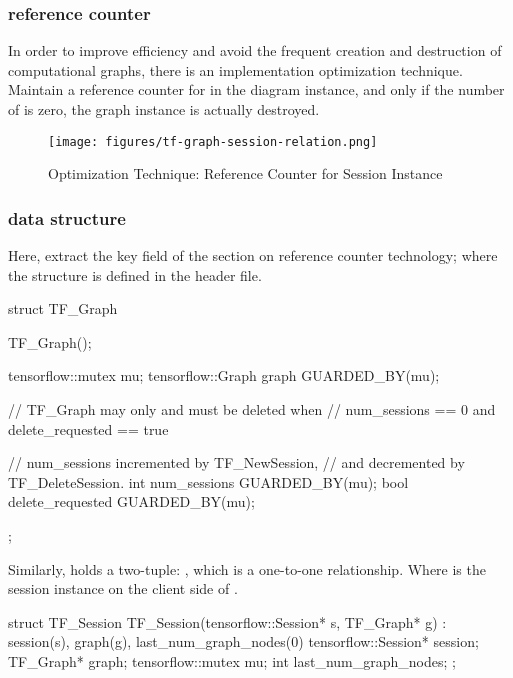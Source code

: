 \begin{content}
\subsubsection{reference counter}

In order to improve efficiency and avoid the frequent creation and destruction of computational graphs, there is an implementation optimization technique. Maintain a reference counter for  in the diagram instance, and only if the number of  is zero, the graph instance is actually destroyed.

\begin{figure}[!htbp]
\centering
\texttt{[image: figures/tf-graph-session-relation.png]}
\caption{Optimization Technique: Reference Counter for Session Instance}
 \label{fig:tf-graph-session-relation}
\end{figure}

\subsubsection{data structure}

Here, extract the key field of the  section on  reference counter technology; where the  structure is defined in the  header file.

\begin{leftbar}
\begin{c++}
struct TF_Graph {
  TF_Graph();

  tensorflow::mutex mu;
  tensorflow::Graph graph GUARDED_BY(mu);

  // TF\_Graph may only and must be deleted when
  // num\_sessions == 0 and delete\_requested == true

  // num\_sessions incremented by TF\_NewSession, 
  // and decremented by TF\_DeleteSession.
  int num_sessions GUARDED_BY(mu);
  bool delete_requested GUARDED_BY(mu);
};
\end{c++}
\end{leftbar}

Similarly,  holds a two-tuple: , which is a one-to-one relationship. Where  is the session instance on the client side of .

\begin{leftbar}
\begin{c++}
struct TF_Session {
  TF_Session(tensorflow::Session* s, TF_Graph* g)
      : session(s), graph(g), last_num_graph_nodes(0) {}
  tensorflow::Session* session;
  TF_Graph* graph;
  tensorflow::mutex mu;
  int last_num_graph_nodes;
};
\end{c++}
\end{leftbar}


\end{content}
